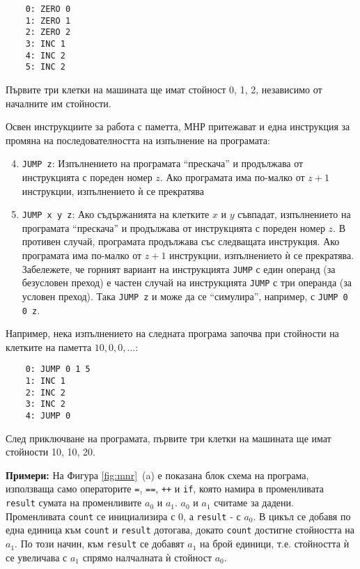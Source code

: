 \documentclass[12pt,a4paper]{article}
\newcommand{\code}[1]{\texttt{#1}}
\begin{document}
{\begin{mdframed}[hidealllines=true,backgroundcolor=gray!20]
	\begin{verbatim}
	0: ZERO 0
	1: ZERO 1
	2: ZERO 2
	3: INC 1
	4: INC 2
	5: INC 2
	\end{verbatim}

	Първите три клетки на машината ще имат стойност 0, 1, 2, независимо от началните им стойности.

	Освен инструкциите за работа с паметта, МНР притежават и една инструкция за промяна на последователността на изпълнение на програмата:

	\begin{enumerate}[label=\arabic*)]
	\setcounter{enumi}{3}
		\item \code{JUMP z}: Изпълнението на програмата ``прескача'' и продължава от инструкцията с пореден номер $z$. Ако програмата има по-малко от $z+1$ инструкции, изпълнението ѝ се прекратява
		\item \code{JUMP x y z}: Ако съдържанията на клетките  $x$ и $y$ съвпадат, изпълнението на програмата ``прескача'' и продължава от инструкцията с пореден номер $z$. В противен случай, програмата продължава със следващата инструкция. Ако програмата има по-малко от $z+1$ инструкции, изпълнението ѝ се прекратява. Забележете, че горният вариант на инструкцията \code{JUMP} с един операнд (за безусловен преход) е частен случай на инструкцията \code{JUMP} с три операнда (за условен преход). Така \code{JUMP z} и може да се ``симулира'', например, с \code{JUMP 0 0 z}.
	\end{enumerate}

	Например, нека изпълнението на следната програма започва при стойности на клетките на паметта $10, 0, 0, \ldots$:

	\begin{verbatim}
	0: JUMP 0 1 5
	1: INC 1
	2: INC 2
	3: INC 2
	4: JUMP 0
	\end{verbatim}

	След приключване на програмата, първите три клетки на машината ще имат стойности 10, 10, 20.

\end{mdframed}

\begin{mdframed}[hidealllines=true,backgroundcolor=gray!20]
\textbf{Примери:} На Фигура \ref{fig:mnr}~(a) е показана блок схема на програма, използваща само операторите \code{=}, \code{==}, \code{++} и \code{if}, която намира в променливата \code{result} сумата на променливите $a_0$ и $a_1$. $a_0$ и $a_1$ считаме за дадени. Променливата \code{count} се инициализира с 0, а \code{result} - с $a_0$. В цикъл се добавя по една единица към \code {count} и \code{result} дотогава, докато \code{count} достигне стойността на $a_1$. По този начин, към \code{result} се добавят $a_1$ на брой единици, т.е. стойността ѝ се увеличава с $a_1$ спрямо налчалната ѝ стойност $a_0$.


\end{mdframed}}
\end{document}

